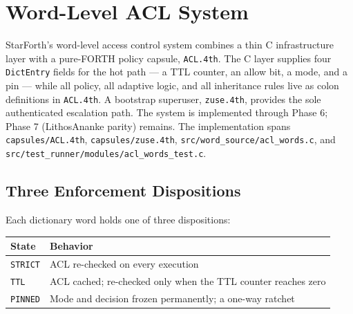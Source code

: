 
\section{Word-Level ACL System}

StarForth's word-level access control system combines a thin C infrastructure
layer with a pure-FORTH policy capsule, \texttt{ACL.4th}. The C layer supplies
four \texttt{DictEntry} fields for the hot path --- a TTL counter, an allow bit,
a mode, and a pin --- while all policy, all adaptive logic, and all inheritance
rules live as colon definitions in \texttt{ACL.4th}. A bootstrap superuser,
\texttt{zuse.4th}, provides the sole authenticated escalation path. The system
is implemented through Phase 6; Phase 7 (LithosAnanke parity) remains. The
implementation spans \texttt{capsules/ACL.4th}, \texttt{capsules/zuse.4th},
\texttt{src/word\_source/acl\_words.c}, and
\texttt{src/test\_runner/modules/acl\_words\_test.c}.

\subsection{Three Enforcement Dispositions}

Each dictionary word holds one of three dispositions:

\begin{tabular}{ll}
\toprule
State & Behavior \\
\midrule
\texttt{STRICT} & ACL re-checked on every execution \\
\texttt{TTL} & ACL cached; re-checked only when the TTL counter reaches zero \\
\texttt{PINNED} & Mode and decision frozen permanently; a one-way ratchet \\
\bottomrule
\end{tabular}

